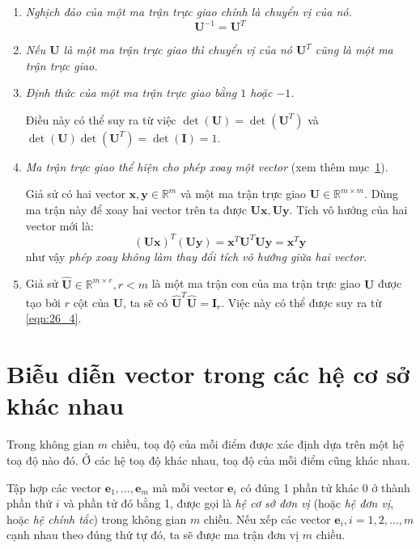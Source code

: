 \begin{enumerate}

\item \textit{Nghịch đảo của một ma trận trực giao chính là chuyển vị của
nó.}
\begin{equation*}
\mathbf{U}^{-1} = \mathbf{U}^T
\end{equation*}
\item \textit{Nếu $\mathbf{U}$ là một ma trận trực giao thì chuyển vị của nó
$\mathbf{U}^T$ cũng là một ma trận trực giao.}
\item \textit{Định thức của một ma trận trực giao bằng $1$ hoặc $-1$.}

Điều này có thể suy ra từ việc $\det(\mathbf{U}) = \det(\mathbf{U}^T)$ và
$\det(\mathbf{U}) \det(\mathbf{U}^T) = \det(\mathbf{I}) = 1$.

\item \textit{Ma trận trực giao thể hiện cho phép xoay một vector} (xem thêm
mục~\ref{sec:doi_he_co_so}).

Giả sử có hai vector $\mathbf{x,y} \in \mathbb{R}^m$ và một ma trận trực
giao $\mathbf{U} \in \mathbb{R}^{m \times m}$. Dùng ma trận này để xoay hai
vector trên ta được $\mathbf{Ux}, \mathbf{Uy}$. Tích vô hướng của hai vector
mới là:
\begin{equation*}
(\mathbf{Ux})^T (\mathbf{Uy}) = \mathbf{x}^T \mathbf{U}^T \mathbf{Uy} = \mathbf{x}^T\mathbf{y}
\end{equation*}
như vậy \textit{phép xoay không làm thay đổi tích vô hướng giữa hai vector}.

\item Giả sử $\hat{\mathbf{U}} \in \mathbb{R}^{m \times r}, r < m$ là một ma
trận con của ma trận trực giao $\mathbf{U}$ được tạo bởi $r$ cột của
$\mathbf{U}$, ta sẽ có $\hat{\mathbf{U}}^T\hat{\mathbf{U}} =
\mathbf{I}_{r}$. Việc này có thể được suy ra từ \eqref{eqn:26_4}.

\end{enumerate}



\section{Biễu diễn vector trong các hệ cơ sở khác nhau}
\label{sec:doi_he_co_so}
Trong không gian $m$ chiều, toạ độ của mỗi điểm được xác định dựa trên một hệ
toạ độ nào đó. Ở các hệ toạ độ khác nhau, toạ độ của mỗi điểm cũng khác nhau.

Tập hợp các vector $\mathbf{e}_1, \dots, \mathbf{e}_m$ mà mỗi vector
$\mathbf{e}_i$ có đúng 1 phần tử khác 0 ở thành phần thứ $i$ và phần tử đó bằng
1, được gọi là \textit{hệ cơ sở đơn vị} (hoặc \textit{hệ đơn vị}, hoặc
\textit{hệ chính tắc}) trong không gian $m$ chiều. Nếu xếp các vector
$\mathbf{e}_i, i = 1, 2, \dots, m$ cạnh nhau theo đúng thứ tự đó, ta sẽ được ma
trận đơn vị $m$ chiều.

